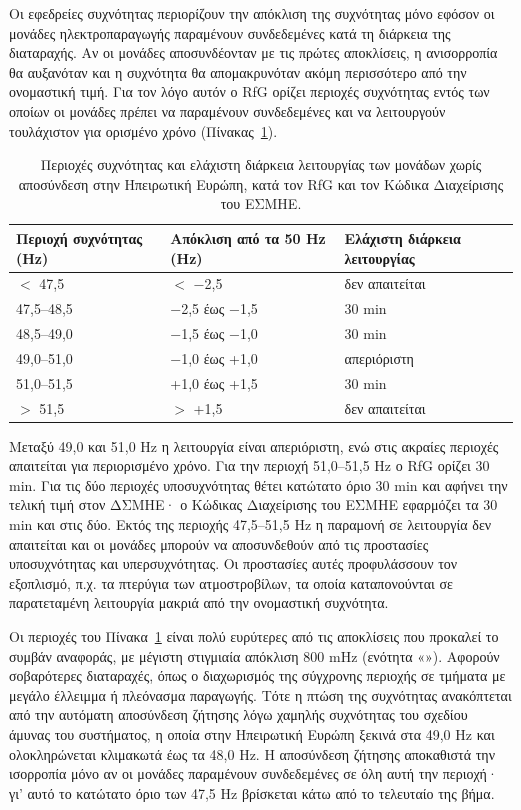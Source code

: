 Οι εφεδρείες συχνότητας περιορίζουν την απόκλιση της συχνότητας μόνο εφόσον οι μονάδες
ηλεκτροπαραγωγής παραμένουν συνδεδεμένες κατά τη διάρκεια της διαταραχής. Αν οι μονάδες
αποσυνδέονταν με τις πρώτες αποκλίσεις, η ανισορροπία θα αυξανόταν και η συχνότητα θα
απομακρυνόταν ακόμη περισσότερο από την ονομαστική τιμή. Για τον λόγο αυτόν ο RfG ορίζει περιοχές συχνότητας εντός των οποίων οι μονάδες πρέπει να παραμένουν
συνδεδεμένες και να λειτουργούν τουλάχιστον για ορισμένο χρόνο (Πίνακας~\ref{tab:f-ranges}).

\begin{table}[!htbp]
\centering
\begin{tabular}{lll}
\hline
\textbf{Περιοχή συχνότητας (Hz)} & \textbf{Απόκλιση από τα 50 Hz (Hz)}
& \textbf{Ελάχιστη διάρκεια λειτουργίας} \\
\hline
$<$ 47,5 & $<$ −2,5 & δεν απαιτείται \\
47,5--48,5 & −2,5 έως −1,5 & 30 min \\
48,5--49,0 & −1,5 έως −1,0 & 30 min \\
49,0--51,0 & −1,0 έως +1,0 & απεριόριστη \\
51,0--51,5 & +1,0 έως +1,5 & 30 min \\
$>$ 51,5 & $>$ +1,5 & δεν απαιτείται \\
\hline
\end{tabular}
\caption{Περιοχές συχνότητας και ελάχιστη διάρκεια λειτουργίας των μονάδων χωρίς αποσύνδεση
στην Ηπειρωτική Ευρώπη, κατά τον RfG και τον Κώδικα Διαχείρισης του ΕΣΜΗΕ.}
\label{tab:f-ranges}
\end{table}

Μεταξύ 49,0 και 51,0 Hz η λειτουργία είναι απεριόριστη, ενώ στις ακραίες περιοχές απαιτείται
για περιορισμένο χρόνο. Για την περιοχή 51,0--51,5 Hz ο RfG ορίζει 30 min. Για τις δύο
περιοχές υποσυχνότητας θέτει κατώτατο όριο 30 min και αφήνει την τελική τιμή στον ΔΣΜΗΕ· ο
Κώδικας Διαχείρισης του ΕΣΜΗΕ εφαρμόζει τα 30 min και στις δύο. Εκτός της περιοχής
47,5--51,5 Hz η παραμονή σε λειτουργία δεν απαιτείται και οι μονάδες μπορούν να αποσυνδεθούν
από τις προστασίες υποσυχνότητας και υπερσυχνότητας. Οι προστασίες αυτές προφυλάσσουν τον
εξοπλισμό, π.χ. τα πτερύγια των ατμοστροβίλων, τα οποία καταπονούνται σε παρατεταμένη
λειτουργία μακριά από την ονομαστική συχνότητα.

Οι περιοχές του Πίνακα~\ref{tab:f-ranges} είναι πολύ ευρύτερες από τις αποκλίσεις που
προκαλεί το συμβάν αναφοράς, με μέγιστη στιγμιαία απόκλιση 800 mHz (ενότητα
«»). Αφορούν σοβαρότερες διαταραχές, όπως ο διαχωρισμός της
σύγχρονης περιοχής σε τμήματα με μεγάλο έλλειμμα ή πλεόνασμα παραγωγής. Τότε η πτώση της
συχνότητας ανακόπτεται από την αυτόματη αποσύνδεση ζήτησης λόγω χαμηλής συχνότητας του
σχεδίου άμυνας του συστήματος, η οποία στην Ηπειρωτική Ευρώπη ξεκινά στα 49,0 Hz και
ολοκληρώνεται κλιμακωτά έως τα 48,0 Hz. Η αποσύνδεση ζήτησης αποκαθιστά την ισορροπία μόνο
αν οι μονάδες παραμένουν συνδεδεμένες σε όλη αυτή την περιοχή· γι' αυτό το κατώτατο όριο των
47,5 Hz βρίσκεται κάτω από το τελευταίο της βήμα.

